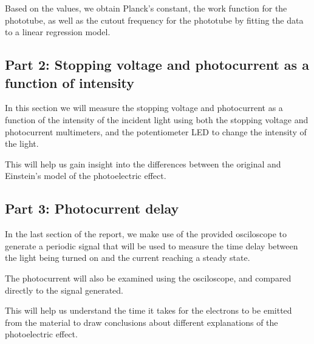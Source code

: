 Based on the values, we obtain Planck's constant, the work function for the phototube, as well as the cutout frequency for the phototube by fitting the data to a linear regression model.

\subsection{Part 2: Stopping voltage and photocurrent as a function of intensity}

In this section we will measure the stopping voltage and photocurrent as a function of the intensity of the incident light using both the stopping voltage and photocurrent multimeters,
and the potentiometer LED to change the intensity of the light.

This will help us gain insight into the differences between the original and Einstein's model of the photoelectric effect.

\subsection{Part 3: Photocurrent delay}

In the last section of the report, we make use of the provided osciloscope to generate a periodic signal that will be used to
measure the time delay between the light being turned on and the current reaching a steady state.

The photocurrent will also be examined using the osciloscope, and compared directly to the signal generated.


This will help us understand the time it takes for the electrons to be emitted from the material to draw conclusions about different explanations of the photoelectric effect.
